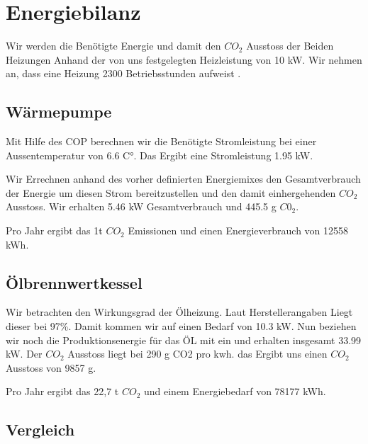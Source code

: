 \chapter{Energiebilanz}
\label{chap:bilanz}

Wir werden die Benötigte Energie und damit den $CO_2$ Ausstoss der Beiden
Heizungen Anhand der von uns festgelegten Heizleistung von 10 kW.
Wir nehmen an, dass eine Heizung 2300 Betriebsstunden aufweist
\cite{heizung:heizung}.

\section{Wärmepumpe}

Mit Hilfe des COP berechnen wir die Benötigte Stromleistung bei einer
Aussentemperatur von 6.6 C°.
Das Ergibt eine Stromleistung 1.95 kW.

Wir Errechnen anhand des vorher definierten Energiemixes den Gesamtverbrauch
der Energie um diesen Strom bereitzustellen und den damit einhergehenden $CO_2$
Ausstoss.
Wir erhalten 5.46 kW Gesamtverbrauch und 445.5 g $C0_2$.

Pro Jahr ergibt das 1t $CO_2$ Emissionen und einen Energieverbrauch von 12558 kWh.

\section{Ölbrennwertkessel}

Wir betrachten den Wirkungsgrad der Ölheizung.
Laut Herstellerangaben Liegt dieser bei 97\%.
Damit kommen wir auf einen Bedarf von 10.3 kW.
Nun beziehen wir noch die Produktionsenergie für das ÖL mit ein und erhalten
insgesamt 33.99 kW.
Der $CO_2$ Ausstoss liegt bei 290 g CO2 pro kwh.\cite{heizung:co2vergleich}
das Ergibt uns einen $CO_2$ Ausstoss von 9857 g.

Pro Jahr ergibt das 22,7 t $CO_2$ und einem Energiebedarf von 78177 kWh.


\section{Vergleich}


